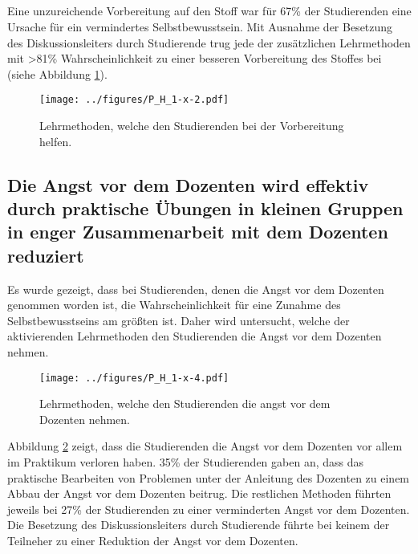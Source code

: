 \subsection{}
Eine unzureichende Vorbereitung auf den Stoff war für 67\% der Studierenden eine Ursache für ein vermindertes Selbstbewusstsein. Mit Ausnahme der Besetzung des Diskussionsleiters durch Studierende trug jede der zusätzlichen Lehrmethoden mit >81\% Wahrscheinlichkeit zu einer besseren Vorbereitung des Stoffes bei (siehe Abbildung \ref{fig:P_H_1-x-2}).
\begin{figure}[h!]
\begin{center}
	\texttt{[image: ../figures/P\_H\_1-x-2.pdf]}
\end{center}
	\label{fig:P_H_1-x-2}
	\caption{Lehrmethoden, welche den Studierenden bei der Vorbereitung helfen.}
\end{figure}

\subsection{Die Angst vor dem Dozenten wird effektiv durch praktische Übungen in kleinen Gruppen in enger Zusammenarbeit mit dem Dozenten reduziert}
Es wurde gezeigt, dass bei Studierenden, denen die Angst vor dem Dozenten genommen worden ist, die Wahrscheinlichkeit für eine Zunahme des Selbstbewusstseins am größten ist. Daher wird untersucht, welche der aktivierenden Lehrmethoden den Studierenden die Angst vor dem Dozenten nehmen.
\begin{figure}[h!]
\begin{center}
	\texttt{[image: ../figures/P\_H\_1-x-4.pdf]}
\end{center}
	\label{fig:P_H_1-x-4}
	\caption{Lehrmethoden, welche den Studierenden die angst vor dem Dozenten nehmen.}
\end{figure}
Abbildung \ref{fig:P_H_1-x-4} zeigt, dass die Studierenden die Angst vor dem Dozenten vor allem im Praktikum verloren haben. 35\% der Studierenden gaben an, dass das praktische Bearbeiten von Problemen unter der Anleitung des Dozenten zu einem Abbau der Angst vor dem Dozenten beitrug. Die restlichen Methoden führten jeweils bei 27\% der Studierenden zu einer verminderten Angst vor dem Dozenten. Die Besetzung des Diskussionsleiters durch Studierende führte bei keinem der Teilneher zu einer Reduktion der Angst vor dem Dozenten.